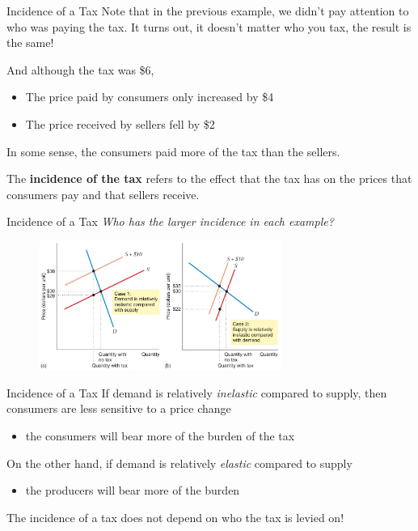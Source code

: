\documentclass[11pt,t]{beamer}
\begin{document}
\begin{frame}{Incidence of a Tax}
  Note that in the previous example, we didn't pay attention to who was paying the tax. It turns out, it doesn't matter who you tax, the result is the same!
  
  \pause\bigskip
  And although the tax was \$6, 
  \begin{itemize}
    \item The price paid by consumers only increased by \$4
    \item The price received by sellers fell by \$2
  \end{itemize}

  In some sense, the consumers paid more of the tax than the sellers.

  \pause \bigskip
  The \textbf{incidence of the tax} refers to the effect that the tax has on the prices that consumers pay and that sellers receive.
\end{frame}

\begin{frame}{Incidence of a Tax}
  \emph{Who has the larger incidence in each example?}
  \begin{figure}
    \includegraphics[width=300px]{figures/fig10_4.jpg}
  \end{figure}
\end{frame}

\begin{frame}{Incidence of a Tax}
  If demand is relatively \textit{inelastic} compared to supply, then consumers are less sensitive to a price change

  \begin{itemize}
    \item the consumers will bear more of the burden of the tax
  \end{itemize}

  \bigskip
  On the other hand, if demand is relatively \textit{elastic} compared to supply
  \begin{itemize}
    \item the producers will bear more of the burden
  \end{itemize}

  \bigskip
  The incidence of a tax does not depend on who the tax is levied on!
\end{frame}
\end{document}

